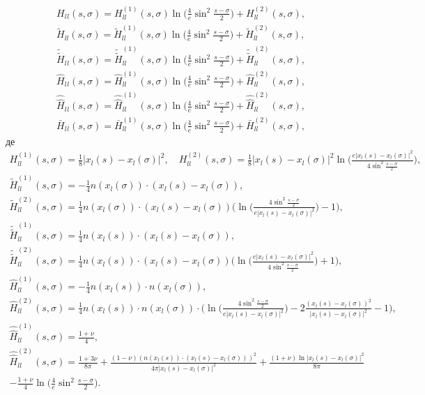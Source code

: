 \documentclass[12pt]{report}
\begin{document}
 \begin{gather}
 	H_l{_l}(s, \sigma)=H^{(1)}_{ll}(s, \sigma)\ln\bigg(\frac{4}{e}\sin^2\frac{s-\sigma}{2}\bigg)+H^{(2)}_{ll}(s, \sigma), \\
	\tilde{H}_{ll}(s, \sigma)=\tilde{H}^{(1)}_{ll}(s, \sigma)\ln\bigg(\frac{4}{e}\sin^2\frac{s-\sigma}{2}\bigg)+\tilde{H}^{(2)}_{ll}(s, \sigma), \\
	\tilde{\tilde{H}}_l{_l}(s, \sigma)=\tilde{\tilde{H}}^{(1)}_{ll}(s, \sigma)\ln\bigg(\frac{4}{e}\sin^2\frac{s-\sigma}{2}\bigg)+\tilde{\tilde{H}}^{(2)}_{ll}(s, \sigma), \\
	\hat{H}_l{_l}(s, \sigma)=\hat{H}^{(1)}_{ll}(s, \sigma)\ln\bigg(\frac{4}{e}\sin^2\frac{s-\sigma}{2}\bigg)+\hat{H}^{(2)}_{ll}(s, \sigma), \\ 
	\hat{\hat{H}}_l{_l}(s, \sigma)=\hat{\hat{H}}^{(1)}_{ll}(s, \sigma)\ln\bigg(\frac{4}{e}\sin^2\frac{s-\sigma}{2}\bigg)+\hat{\hat{H}}^{(2)}_{ll}(s, \sigma), \\
	\bar{H}_l{_l}(s, \sigma)=\bar{H}^{(1)}_{ll}(s, \sigma)\ln\bigg(\frac{4}{e}\sin^2\frac{s-\sigma}{2}\bigg)+\bar{H}^{(2)}_{ll}(s, \sigma),
 \end{gather}
 де 
\begin{gather*}
	H^{(1)}_{ll}(s, \sigma)=\frac{1}{8}|x_l(s)-x_l(\sigma)|^2, \quad H^{(2)}_{ll}(s, \sigma)=\frac{1}{8}|x_l(s)-x_l(\sigma)|^2\ln\Big(\frac{e|x_l(s)-x_l(\sigma)|^2}{4\sin^2\frac{s-\sigma}{2}}\Big), \\
	\tilde{H}^{(1)}_{ll}(s, \sigma)=-\frac{1}{4}n(x_l(\sigma))\cdot(x_l(s)-x_l(\sigma)), \\
	 \tilde{H}^{(2)}_{ll}(s, \sigma)= \frac{1}{4}n(x_l(\sigma))\cdot(x_l(s)-x_l(\sigma))\bigg(\ln\Big(\frac{4\sin^2\frac{s-\sigma}{2}}{e|x_l(s)-x_l(\sigma)|^2}\Big)-1\bigg),\\
	\tilde{\tilde{H}}^{(1)}_{ll}(s, \sigma)=\frac{1}{4}n(x_l(s))\cdot(x_l(s)-x_l(\sigma)), \\
	 \tilde{\tilde{H}}^{(2)}_{ll}(s, \sigma)= \frac{1}{4}n(x_l(s))\cdot(x_l(s)-x_l(\sigma))\bigg(\ln\Big(\frac{e|x_l(s)-x_l(\sigma)|^2}{4\sin^2\frac{s-\sigma}{2}}\Big)+1\bigg),\\
	\hat{H}^{(1)}_{ll}(s, \sigma)= -\frac{1}{4}n(x_l(s))\cdot n(x_l(\sigma)), \\
	 \hat{H}^{(2)}_{ll}(s, \sigma)=\frac{1}{4}n(x_l(s))\cdot n(x_l(\sigma))\cdot\bigg(\ln\Big(\frac{4\sin^2\frac{s-\sigma}{2}}{e|x_l(s)-x_l(\sigma)|^2}\Big)-2\frac{(x_l(s)-x_l(\sigma))^2}{|x_l(s)-x_l(\sigma)|^2} -1\bigg), \\
	 \hat{\hat{H}}^{(1)}_{ll}(s, \sigma)= \frac{1+\nu}{4}, \\
	 \hat{\hat{H}}^{(2)}_{ll}(s, \sigma) = \frac{1+3\nu}{8\pi}+\frac{(1-\nu)(n(x_l(s))\cdot(x_l(s)-x_l(\sigma)))^2}{4\pi|x_l(s)-x_l(\sigma)|^2}+\frac{(1+\nu)\ln|x_l(s)-x_l(\sigma)|^2}{8\pi}\\
	-\frac{1+\nu}{4}\ln\bigg(\frac{4}{e}\sin^2\frac{s-\sigma}{2}\bigg).
 \end{gather*}
 
\end{document}
